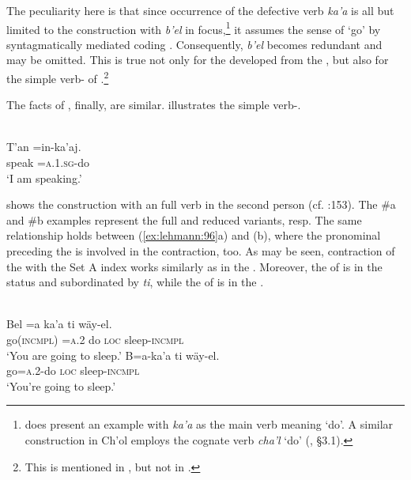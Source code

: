 \documentclass[output=paper]{langsci/langscibook}
\begin{document}
The peculiarity here is that since occurrence of the defective verb \textit{ka’a} is all but limited to the construction with \textit{b’el} in focus,\footnote{\citet[17]{Hofling1991} does present an example with \textit{ka’a} as the main verb meaning ‘do’. A similar construction in Ch'ol employs the cognate verb \textit{cha’l} ‘do’ (\citealt{Coon2010}, §3.1).} it assumes the sense of ‘go’ by syntagmatically mediated coding \citep{Lehmann2014}. Consequently, \textit{b’el} becomes redundant and may be omitted. This is true not only for the  developed from the , but also for the simple verb- of .\footnote{This is mentioned in \citet{BriceñoChel2000ir}, but not in \citet{Hofling1991}.}

The facts of , finally, are similar.  illustrates the simple verb-.

\ea\label{ex:lehmann:94}
\\
\gll      T’an  =in-ka’aj.\\
  speak  =\textsc{a.1.sg-}do\\
\glt ‘I am speaking.’ \citep[154]{Hofling2011}
\z

 shows the  construction with an  full verb in the second person (cf. \citealt{Hofling2011}:153). The \#a and \#b examples represent the full and reduced variants, resp. The same relationship holds between (\ref{ex:lehmann:96}a) and (b), where the pronominal  preceding the  is involved in the contraction, too. As may be seen, contraction of the  with the Set A index works similarly as in the  . Moreover, the  of  is in the  status and subordinated by \textit{ti}, while the  of  is in the .

\ea\label{ex:lehmann:95}
 \\
 \ea
\gll   Bel        =a    ka’a    ti    wäy-el.\\
  go(\textsc{incmpl)} \textsc{=a.2}   do      \textsc{loc}  sleep-\textsc{incmpl}\\
\glt ‘You are going to sleep.’
\ex
\gll  B=a-ka’a    ti    wäy-el.\\
  go=\textsc{a.2}{}-do  \textsc{loc}  sleep-\textsc{incmpl}\\
\glt ‘You’re going to sleep.’
\z
\z
\end{document}
